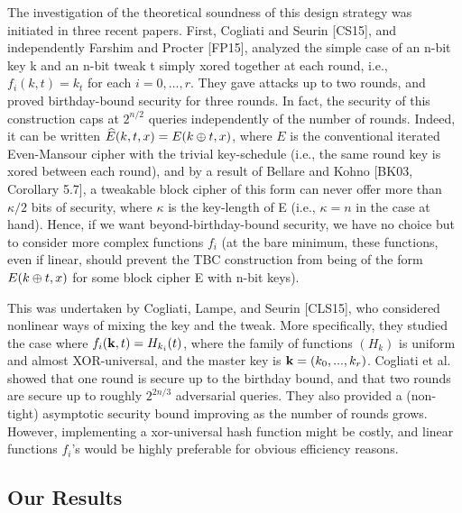 The investigation of the theoretical soundness of this design strategy was initiated in three
recent papers. First, Cogliati and Seurin [CS15], and independently Farshim and Procter [FP15],
analyzed the simple case of an n-bit key k and an n-bit tweak t simply xored together at each
round, i.e., $f_i(k,t) = k_t$ for each $i = 0, . . . , r$. They gave attacks up to two rounds, and proved
birthday-bound security for three rounds. In fact, the security of this construction caps at $2^{n/2}$
queries independently of the number of rounds. Indeed, it can be written $\widehat{E}(k, t, x) = E(k\oplus t, x)$,
where $E$ is the conventional iterated Even-Mansour cipher with the trivial key-schedule (i.e.,
the same round key is xored between each round), and by a result of Bellare and Kohno [BK03,
Corollary 5.7], a tweakable block cipher of this form can never offer more than $\kappa/2$ bits of
security, where $\kappa$ is the key-length of E (i.e., $\kappa = n$ in the case at hand). Hence, if we want
beyond-birthday-bound security, we have no choice but to consider more complex functions $f_i$
(at the bare minimum, these functions, even if linear, should prevent the TBC construction
from being of the form $E(k\oplus t, x)$ for some block cipher E with n-bit keys).




This was undertaken by Cogliati, Lampe, and Seurin [CLS15], who considered nonlinear
ways of mixing the key and the tweak. More specifically, they studied the case where $f_i(\mathbf{k}, t) =
H_{k_i}(t)$, where the family of functions $(H_k)$ is uniform and almost XOR-universal, and the
master key is $\mathbf{k} = (k_0, . . . , k_r)$. Cogliati et al. showed that one round is secure up to the birthday bound,
and that two rounds are secure up to roughly $2^{2n/3}$ adversarial queries. They also provided a
(non-tight) asymptotic security bound improving as the number of rounds grows. However,
implementing a xor-universal hash function might be costly, and linear functions $f_i$'s would be highly preferable for obvious efficiency reasons.




\subsection{Our Results}


